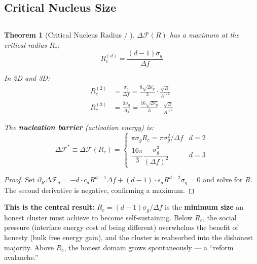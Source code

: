 \documentclass[12pt,a4paper]{article}
\theoremstyle{plain}
\newtheorem{theorem}{ Theorem}[section]
\theoremstyle{definition}
\newcommand{\cF}{\mathcal{F}}
\newcommand{\Rc}{R_c}                 %
\begin{document}
\subsection{Critical Nucleus Size}
\subsection*{}

\begin{theorem}[Critical Nucleus Radius / ]
\label{thm:critical_nucleus}
$\Delta\cF(R)$ has a maximum at the critical radius $\Rc$:
\begin{equation}
    \Rc^{(d)} = \frac{(d-1)\sigma_g}{\Delta f}
    \label{eq:Rc_general}
\end{equation}

In 2D and 3D:
\begin{align}
    \Rc^{(2)} &= \frac{\sigma_g}{\Delta f}
    = \frac{8\sqrt{2\kappa_g}}{3}\cdot\frac{\sqrt{B}}{A^{1/2}}
    \label{eq:Rc_2d} \\[4pt]
    \Rc^{(3)} &= \frac{2\sigma_g}{\Delta f}
    = \frac{16\sqrt{2\kappa_g}}{3}\cdot\frac{\sqrt{B}}{A^{1/2}}
    \label{eq:Rc_3d}
\end{align}

The \textbf{nucleation barrier} (activation energy) is:
\begin{equation}
    \Delta \cF^* \equiv \Delta \cF(\Rc) =
    \begin{cases}
        \pi \sigma_g \Rc = \pi\sigma_g^2/\Delta f & d=2 \\[4pt]
        \dfrac{16\pi}{3}\dfrac{\sigma_g^3}{(\Delta f)^2} & d=3
    \end{cases}
    \label{eq:nucleation_barrier}
\end{equation}
\end{theorem}

\begin{proof}
Set $\partial_R\Delta\cF_d = -d\cdot c_d R^{d-1}\Delta f + (d-1)\cdot s_d R^{d-2}\sigma_g = 0$
and solve for $R$. The second derivative is negative, confirming a maximum.
\end{proof}

\textbf{This is the central result:} $\Rc = (d-1)\sigma_g/\Delta f$ is the
\textbf{minimum size} an honest cluster must achieve to become self-sustaining.
Below $\Rc$, the social pressure (interface energy cost of being different)
overwhelms the benefit of honesty (bulk free energy gain), and the cluster
is reabsorbed into the dishonest majority. Above $\Rc$, the honest domain
grows spontaneously — a ``reform avalanche.''
\end{document}
